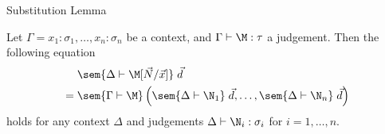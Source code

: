\begin{frame}{Substitution Lemma}
  \begin{lemma}
    Let $\Gamma = x_1 : \sigma_1, \ldots, x_n : \sigma_n$ be a context, and
    $\Gamma \vdash \M : \tau$ a judgement.  Then the following equation 
    \begin{align*}
      & \sem{\Delta \vdash \M[\vec{N}/\vec{x}]}\; \vec{d} \\
      ={} & \sem{\Gamma \vdash \M}
      \left(
        \sem{\Delta\vdash \N_1}\;\vec{d}, \ldots, 
        \sem{\Delta\vdash \N_n}\;\vec{d}
      \right)
    \end{align*}
    holds for any context $\Delta$ and judgements $\Delta \vdash \N_i :
    \sigma_i$ for $i = 1, \ldots, n$.
  \end{lemma}
\end{frame}

